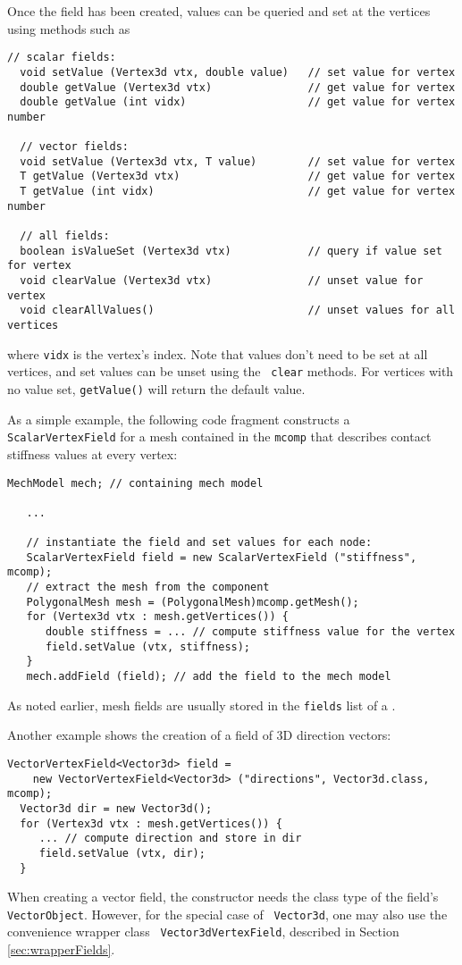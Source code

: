 Once the field has been created, values can be queried and set at the
vertices using methods such as
%
\begin{lstlisting}[]
  // scalar fields:
  void setValue (Vertex3d vtx, double value)   // set value for vertex
  double getValue (Vertex3d vtx)               // get value for vertex
  double getValue (int vidx)                   // get value for vertex number

  // vector fields:
  void setValue (Vertex3d vtx, T value)        // set value for vertex
  T getValue (Vertex3d vtx)                    // get value for vertex
  T getValue (int vidx)                        // get value for vertex number

  // all fields:
  boolean isValueSet (Vertex3d vtx)            // query if value set for vertex
  void clearValue (Vertex3d vtx)               // unset value for vertex
  void clearAllValues()                        // unset values for all vertices
\end{lstlisting}
%
where {\tt vidx} is the vertex's index. Note that values don't need to
be set at all vertices, and set values can be unset using the {\tt
clear} methods. For vertices with no value set, {\tt getValue()} will
return the default value.

As a simple example, the following code fragment constructs a {\tt
ScalarVertexField} for a mesh contained in the 
 {\tt mcomp}
that describes contact stiffness values 
at every vertex:
%
\begin{lstlisting}[]
   MechModel mech; // containing mech model
   
   ...

   // instantiate the field and set values for each node:
   ScalarVertexField field = new ScalarVertexField ("stiffness", mcomp);
   // extract the mesh from the component
   PolygonalMesh mesh = (PolygonalMesh)mcomp.getMesh();
   for (Vertex3d vtx : mesh.getVertices()) {
      double stiffness = ... // compute stiffness value for the vertex
      field.setValue (vtx, stiffness);
   }
   mech.addField (field); // add the field to the mech model
\end{lstlisting}
%
As noted earlier, mesh fields are usually stored in the {\tt fields}
list of a .

Another example shows the creation of a field of 3D direction vectors:
%
\begin{lstlisting}[]
  VectorVertexField<Vector3d> field =
    new VectorVertexField<Vector3d> ("directions", Vector3d.class, mcomp);
  Vector3d dir = new Vector3d();
  for (Vertex3d vtx : mesh.getVertices()) {
     ... // compute direction and store in dir
     field.setValue (vtx, dir);
  }
\end{lstlisting}
%
When creating a vector field, the constructor needs the class type of
the field's {\tt VectorObject}. However, for the special case of {\tt
Vector3d}, one may also use the convenience wrapper class {\tt
Vector3dVertexField}, described in Section \ref{sec:wrapperFields}.

